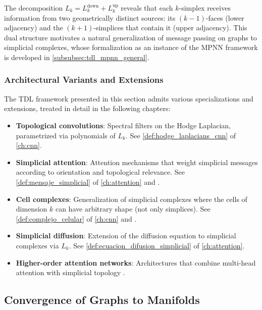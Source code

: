 The decomposition $L_k = L_k^{\mathrm{down}} + L_k^{\mathrm{up}}$ reveals that each $k$-simplex receives information from two geometrically distinct sources: its $(k{-}1)$-faces (lower adjacency) and the $(k{+}1)$-simplices that contain it (upper adjacency). This dual structure motivates a natural generalization of message passing on graphs to simplicial complexes, whose formalization as an instance of the \gls{MPNN} framework is developed in \autoref{subsubsec:tdl_mpnn_general}.

\subsubsection{Architectural Variants and Extensions}\label{subsubsec:variantes_tdl}

The \gls{TDL} framework presented in this section admits various specializations and extensions, treated in detail in the following chapters:

\begin{itemize}
	\item \textbf{Topological convolutions}: Spectral filters on the Hodge Laplacian, parametrized via polynomials of $L_k$. See \autoref{def:hodge_laplacians_cnn} of \autoref{ch:cnn}.
	\item \textbf{Simplicial attention}: Attention mechanisms that weight simplicial messages according to orientation and topological relevance. See \autoref{def:mensaje_simplicial} of \autoref{ch:attention} and \citep{giusti2022simplicial}.
	\item \textbf{Cell complexes}: Generalization of simplicial complexes where the cells of dimension $k$ can have arbitrary shape (not only simplices). See \autoref{def:complejo_celular} of \autoref{ch:cnn} and \citep{bodnar2021cellular}.
	\item \textbf{Simplicial diffusion}: Extension of the diffusion equation to simplicial complexes via $L_k$. See \autoref{def:ecuacion_difusion_simplicial} of \autoref{ch:attention}.
	\item \textbf{Higher-order attention networks}: Architectures that combine multi-head attention with simplicial topology \citep{hajij2022higherorder, hajij2023topological}.
\end{itemize}

\subsection{Convergence of Graphs to Manifolds}\label{subsec:convergencia_grafos_variedades}

